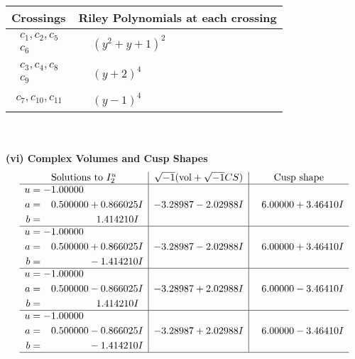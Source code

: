 \documentclass[1p]{elsarticle_modified}
\theoremstyle{definition}
\newcommand{\I}{\sqrt{-1}}
\begin{document}
\begin{tabular}{m{50pt}|m{274pt}}
Crossings & \hspace{64pt}Riley Polynomials at each crossing \\
\hline $$\begin{aligned}c_{1},c_{2},c_{5}\\c_{6}\end{aligned}$$&$\begin{aligned}
&(y^2+y+1)^2
\end{aligned}$\\
\hline $$\begin{aligned}c_{3},c_{4},c_{8}\\c_{9}\end{aligned}$$&$\begin{aligned}
&(y+2)^4
\end{aligned}$\\
\hline $$\begin{aligned}c_{7},c_{10},c_{11}\end{aligned}$$&$\begin{aligned}
&(y-1)^4
\end{aligned}$\\
\hline
\end{tabular}\\~\\
\newpage\flushleft \textbf{(vi) Complex Volumes and Cusp Shapes}
$$\begin{array}{c|c|c}  
\text{Solutions to }I^u_{2}& \I (\text{vol} + \sqrt{-1}CS) & \text{Cusp shape}\\
 \hline 
\begin{aligned}
u &= -1.00000\phantom{ +0.000000I} \\
a &= \phantom{-}0.500000 + 0.866025 I \\
b &= \phantom{-0.000000 -}1.414210 I\end{aligned}
 & -3.28987 - 2.02988 I & \phantom{-}6.00000 + 3.46410 I \\ \hline\begin{aligned}
u &= -1.00000\phantom{ +0.000000I} \\
a &= \phantom{-}0.500000 + 0.866025 I \\
b &= \phantom{-0.000000 } -1.414210 I\end{aligned}
 & -3.28987 - 2.02988 I & \phantom{-}6.00000 + 3.46410 I \\ \hline\begin{aligned}
u &= -1.00000\phantom{ +0.000000I} \\
a &= \phantom{-}0.500000 - 0.866025 I \\
b &= \phantom{-0.000000 -}1.414210 I\end{aligned}
 & -3.28987 + 2.02988 I & \phantom{-}6.00000 - 3.46410 I \\ \hline\begin{aligned}
u &= -1.00000\phantom{ +0.000000I} \\
a &= \phantom{-}0.500000 - 0.866025 I \\
b &= \phantom{-0.000000 } -1.414210 I\end{aligned}
 & -3.28987 + 2.02988 I & \phantom{-}6.00000 - 3.46410 I\\
 \hline 
 \end{array}$$\newpage\newpage\renewcommand{\arraystretch}{1}
\end{document}
